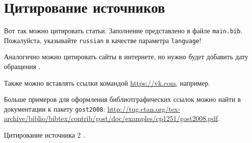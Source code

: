 \section{Цитирование источников}

Вот так \cite{Article} можно цитировать статьи. 
Заполнение представлено в файле \texttt{main.bib}. 
Пожалуйста, указывайте \texttt{russian} в качестве параметра \texttt{language}!

Аналогично можно цитировать сайты в интернете, но нужно будет добавить 
дату обращения \cite{Wikipedia}.

Также можно вставлять ссылки командой \url{https://vk.com}, например.

Больше примеров для оформления библиотграфических ссылок можно найти в 
документации к пакету \texttt{gost2008}: 
\url{http://tug.ctan.org/tex-archive/biblio/bibtex/contrib/gost/doc/examples/cp1251/gost2008.pdf}.



\lipsum[1-4]

Цитирование источника 2 \cite{cite_1_11}.
